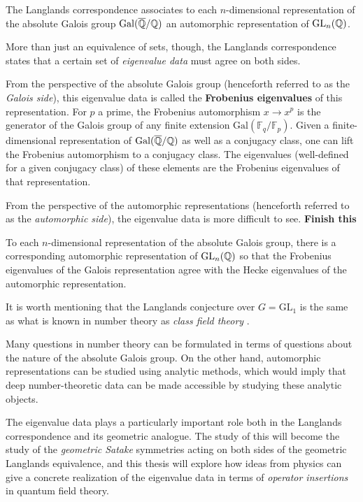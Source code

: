 \begin{idea}
	The Langlands correspondence associates to each $n$-dimensional representation of the absolute Galois group $\mathrm{Gal}(\overline {\mathbb{Q}}/\mathbb{Q})$ an automorphic representation of $\mathrm{GL}_n(\mathbb{Q})$.
\end{idea}
More than just an equivalence of sets, though, the Langlands correspondence states that a certain set of \emph{eigenvalue data} must agree on both sides. 

From the perspective of the absolute Galois group (henceforth referred to as the \emph{Galois side}), this eigenvalue data is called the \textbf{Frobenius eigenvalues} of this representation. For $p$ a prime, the Frobenius automorphism $x \to x^p$ is the generator of the Galois group of any finite extension $\mathrm{Gal}(\mathbb F_q/\mathbb F_p)$. Given a finite-dimensional representation of $\mathrm{Gal}(\overline {\mathbb{Q}}/\mathbb{Q})$ as well as a conjugacy class, one can lift the Frobenius automorphism to a conjugacy class. The eigenvalues (well-defined for a given conjugacy class) of these elements are the Frobenius eigenvalues of that representation. 

From the perspective of the automorphic representations (henceforth referred to as the \emph{automorphic side}), the eigenvalue data is more difficult to see. 
\textbf{Finish this}


\begin{conj}[Langlands]
	To each $n$-dimensional representation of the absolute Galois group, there is a corresponding automorphic representation of $\mathrm{GL}_n(\mathbb{Q})$ so that the Frobenius eigenvalues of the Galois representation agree with the Hecke eigenvalues of the automorphic representation.
\end{conj}

It is worth mentioning that the Langlands conjecture over $G = \mathrm{GL}_1$ is the same as what is known in number theory as \emph{class field theory} \cite{Yoo18}. 


Many questions in number theory can be formulated in terms of questions about the nature of the absolute Galois group. On the other hand, automorphic representations can be studied using analytic methods, which would imply that deep number-theoretic data can be made accessible by studying these analytic objects.

The eigenvalue data plays a particularly important role both in the Langlands correspondence and its geometric analogue. The study of this will become the study of the \emph{geometric Satake} symmetries acting on both sides of the geometric Langlands equivalence, and this thesis will explore how ideas from physics can give a concrete realization of the eigenvalue data in terms of \emph{operator insertions} in quantum field theory. 

